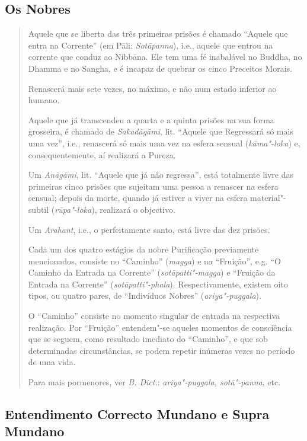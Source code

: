 \subsection{Os Nobres}

\label{ariya-puggala}

\begin{quote}
  Aquele que se liberta das três primeiras prisões é chamado “Aquele que entra
  na Corrente” (em Pāli: \emph{Sotāpanna}), i.e., aquele que entrou na corrente
  que conduz ao Nibbāna. Ele tem uma fé inabalável no Buddha, no Dhamma e no
  Sangha, e é incapaz de quebrar os cinco Preceitos Morais.

  Renascerá mais sete vezes, no máximo, e não num estado inferior ao humano.

  Aquele que já transcendeu a quarta e a quinta prisões na sua forma grosseira,
  é chamado de \emph{Sakadāgāmi}, lit. “Aquele que Regressará só mais uma
  vez”, i.e., renascerá só mais uma vez na esfera sensual (\emph{kāma"-loka}) e,
  consequentemente, aí realizará a Pureza.

  Um \emph{Anāgāmi}, lit. “Aquele que já não regressa”, está totalmente livre
  das primeiras cinco prisões que sujeitam uma pessoa a renascer na esfera
  sensual; depois da morte, quando já estiver a viver na esfera material"-subtil
  (\emph{rūpa"-loka}), realizará o objectivo.

  Um \emph{Arahant}, i.e., o perfeitamente santo, está livre das dez prisões.

  Cada um dos quatro estágios da nobre Purificação previamente mencionados,
  consiste no “Caminho” (\emph{magga}) e na “Fruição”, e.g. “O Caminho da Entrada
  na Corrente” (\emph{sotāpatti"-magga}) e “Fruição da Entrada na Corrente”
  (\emph{sotāpatti"-phala}). Respectivamente, existem oito tipos, ou quatro pares, de
  “Indivíduos Nobres” (\emph{ariya"-puggala}).

  O “Caminho” consiste no momento singular de entrada na respectiva
  realização. Por “Fruição” entendem"-se aqueles momentos de consciência que se
  seguem, como resultado imediato do “Caminho”, e que sob determinadas
  circunstâncias, se podem repetir inúmeras vezes no período de uma vida.

  Para mais pormenores, ver \emph{B. Dict.}: \emph{ariya"-puggala, sotā"-panna}, etc.
\end{quote}

\subsection{Entendimento Correcto Mundano e Supra Mundano}

